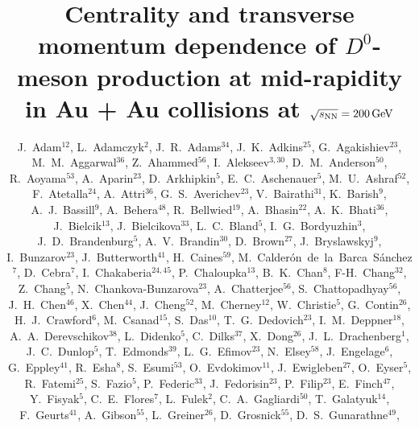 \documentclass[%
 reprint,	
 amsmath,amssymb,
 aps,
 prc,
]{revtex4-1}
\begin{document}

\title{Centrality and transverse momentum dependence of $D^0$-meson production at mid-rapidity in Au + Au collisions at ${\sqrt{s_{\rm NN}} = \rm{200\,GeV}}$}%



\author{
J.~Adam$^{12}$,
L.~Adamczyk$^{2}$,
J.~R.~Adams$^{34}$,
J.~K.~Adkins$^{25}$,
G.~Agakishiev$^{23}$,
M.~M.~Aggarwal$^{36}$,
Z.~Ahammed$^{56}$,
I.~Alekseev$^{3,30}$,
D.~M.~Anderson$^{50}$,
R.~Aoyama$^{53}$,
A.~Aparin$^{23}$,
D.~Arkhipkin$^{5}$,
E.~C.~Aschenauer$^{5}$,
M.~U.~Ashraf$^{52}$,
F.~Atetalla$^{24}$,
A.~Attri$^{36}$,
G.~S.~Averichev$^{23}$,
V.~Bairathi$^{31}$,
K.~Barish$^{9}$,
A.~J.~Bassill$^{9}$,
A.~Behera$^{48}$,
R.~Bellwied$^{19}$,
A.~Bhasin$^{22}$,
A.~K.~Bhati$^{36}$,
J.~Bielcik$^{13}$,
J.~Bielcikova$^{33}$,
L.~C.~Bland$^{5}$,
I.~G.~Bordyuzhin$^{3}$,
J.~D.~Brandenburg$^{5}$,
A.~V.~Brandin$^{30}$,
D.~Brown$^{27}$,
J.~Bryslawskyj$^{9}$,
I.~Bunzarov$^{23}$,
J.~Butterworth$^{41}$,
H.~Caines$^{59}$,
M.~Calder{\'o}n~de~la~Barca~S{\'a}nchez$^{7}$,
D.~Cebra$^{7}$,
I.~Chakaberia$^{24,45}$,
P.~Chaloupka$^{13}$,
B.~K.~Chan$^{8}$,
F-H.~Chang$^{32}$,
Z.~Chang$^{5}$,
N.~Chankova-Bunzarova$^{23}$,
A.~Chatterjee$^{56}$,
S.~Chattopadhyay$^{56}$,
J.~H.~Chen$^{46}$,
X.~Chen$^{44}$,
J.~Cheng$^{52}$,
M.~Cherney$^{12}$,
W.~Christie$^{5}$,
G.~Contin$^{26}$,
H.~J.~Crawford$^{6}$,
M.~Csanad$^{15}$,
S.~Das$^{10}$,
T.~G.~Dedovich$^{23}$,
I.~M.~Deppner$^{18}$,
A.~A.~Derevschikov$^{38}$,
L.~Didenko$^{5}$,
C.~Dilks$^{37}$,
X.~Dong$^{26}$,
J.~L.~Drachenberg$^{1}$,
J.~C.~Dunlop$^{5}$,
T.~Edmonds$^{39}$,
L.~G.~Efimov$^{23}$,
N.~Elsey$^{58}$,
J.~Engelage$^{6}$,
G.~Eppley$^{41}$,
R.~Esha$^{8}$,
S.~Esumi$^{53}$,
O.~Evdokimov$^{11}$,
J.~Ewigleben$^{27}$,
O.~Eyser$^{5}$,
R.~Fatemi$^{25}$,
S.~Fazio$^{5}$,
P.~Federic$^{33}$,
J.~Fedorisin$^{23}$,
P.~Filip$^{23}$,
E.~Finch$^{47}$,
Y.~Fisyak$^{5}$,
C.~E.~Flores$^{7}$,
L.~Fulek$^{2}$,
C.~A.~Gagliardi$^{50}$,
T.~Galatyuk$^{14}$,
F.~Geurts$^{41}$,
A.~Gibson$^{55}$,
L.~Greiner$^{26}$,
D.~Grosnick$^{55}$,
D.~S.~Gunarathne$^{49}$,
}
\end{document}
